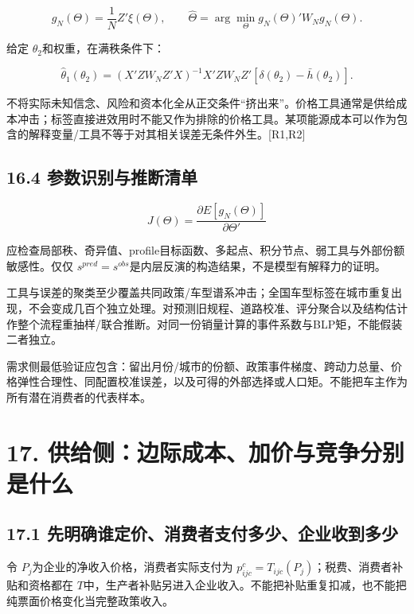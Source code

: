 \documentclass[
  11pt,
]{article}
\begin{document}
\[
g_N(\Theta)=\frac1N Z'\xi(\Theta),\qquad
\widehat\Theta=\arg\min_\Theta g_N(\Theta)'W_Ng_N(\Theta).
\tag{70}
\]

给定 \(\theta_2\)和权重，在满秩条件下：

\[
\widehat\theta_1(\theta_2)
=(X'ZW_NZ'X)^{-1}X'ZW_NZ'
[\delta(\theta_2)-\bar h(\theta_2)].
\tag{71}
\]

不将实际未知信念、风险和资本化全从正交条件``挤出来''。价格工具通常是供给成本冲击；标签直接进效用时不能又作为排除的价格工具。某项能源成本可以作为包含的解释变量/工具不等于对其相关误差无条件外生。{[}R1,R2{]}

\subsection{16.4
参数识别与推断清单}\label{ux53c2ux6570ux8bc6ux522bux4e0eux63a8ux65adux6e05ux5355}

\[
J(\Theta)=\frac{\partial E[g_N(\Theta)]}{\partial\Theta'}
\tag{72}
\]

应检查局部秩、奇异值、profile目标函数、多起点、积分节点、弱工具与外部份额敏感性。仅仅
\(s^{pred}=s^{obs}\)是内层反演的构造结果，不是模型有解释力的证明。

工具与误差的聚类至少覆盖共同政策/车型谱系冲击；全国车型标签在城市重复出现，不会变成几百个独立处理。对预测旧规程、道路校准、评分聚合以及结构估计作整个流程重抽样/联合推断。对同一份销量计算的事件系数与BLP矩，不能假装二者独立。

需求侧最低验证应包含：留出月份/城市的份额、政策事件梯度、跨动力总量、价格弹性合理性、同配置校准误差，以及可得的外部选择或人口矩。不能把车主作为所有潜在消费者的代表样本。

\section{17.
供给侧：边际成本、加价与竞争分别是什么}\label{ux4f9bux7ed9ux4fa7ux8fb9ux9645ux6210ux672cux52a0ux4ef7ux4e0eux7adeux4e89ux5206ux522bux662fux4ec0ux4e48}

\subsection{17.1
先明确谁定价、消费者支付多少、企业收到多少}\label{ux5148ux660eux786eux8c01ux5b9aux4ef7ux6d88ux8d39ux8005ux652fux4ed8ux591aux5c11ux4f01ux4e1aux6536ux5230ux591aux5c11}

令 \(P_j\)为企业的净收入价格，消费者实际支付为
\(p^c_{ijc}=T_{ijc}(P_j)\)；税费、消费者补贴和资格都在
\(T\)中，生产者补贴另进入企业收入。不能把补贴重复扣减，也不能把纯票面价格变化当完整政策收入。
\end{document}
